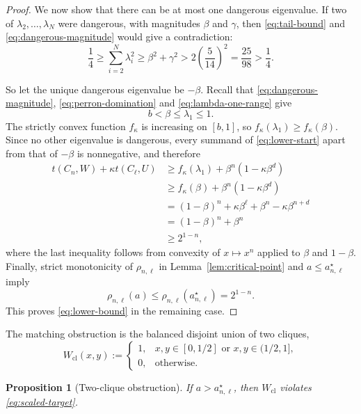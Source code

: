 \documentclass[11pt]{article}
\newtheorem{proposition}[theorem]{Proposition}
\theoremstyle{definition}
\theoremstyle{remark}
\begin{document}
\begin{proof}
  We now show that there can be at most one dangerous eigenvalue.  If two of
  $\lambda_2,\ldots,\lambda_N$ were dangerous, with magnitudes $\beta$ and
  $\gamma$, then \eqref{eq:tail-bound} and \eqref{eq:dangerous-magnitude}
  would give a contradiction:
  \[
    \frac14
    \ge\sum_{i=2}^N\lambda_i^2
    \ge\beta^2+\gamma^2
    >2\left(\frac5{14}\right)^2
    =\frac{25}{98}
    >\frac14.
  \]

  So let the unique dangerous eigenvalue be $-\beta$.  Recall that
  \eqref{eq:dangerous-magnitude}, \eqref{eq:perron-domination} and
  \eqref{eq:lambda-one-range} give
  \[
    b<\beta\le\lambda_1\le1 .
  \]
  The strictly convex function $f_\kappa$ is increasing on $[b,1]$, so
  $f_\kappa(\lambda_1)\ge f_\kappa(\beta)$.  Since no other eigenvalue is
  dangerous, every summand of \eqref{eq:lower-start} apart from that of
  $-\beta$ is nonnegative, and therefore
  \begin{align*}
    t(C_n,W)+\kappa t(C_\ell,U)
    &\ge f_\kappa(\lambda_1)+\beta^n(1-\kappa\beta^d)\\
    &\ge f_\kappa(\beta)+\beta^n(1-\kappa\beta^d)\\
    &=(1-\beta)^n+\kappa\beta^\ell
      +\beta^n-\kappa\beta^{n+d}\\
    &=(1-\beta)^n+\beta^n\\
    &\ge2^{1-n},
  \end{align*}
  where the last inequality follows from convexity of $x\mapsto x^n$ applied
  to $\beta$ and $1-\beta$.  Finally, strict monotonicity of $\rho_{n,\ell}$ in 
  Lemma~\ref{lem:critical-point} and $a\le a_{n,\ell}^{\star}$ imply
  \[
    \rho_{n,\ell}(a)
    \le\rho_{n,\ell}(a_{n,\ell}^{\star})
    =2^{1-n}.
  \]
  This proves \eqref{eq:lower-bound} in the remaining case.
\end{proof}

The matching obstruction is the balanced disjoint union of two cliques,
\[
  W_{\mathrm{cl}}(x,y)
  :=
  \begin{cases}
    1,&x,y\in[0,1/2]
       \text{ or }x,y\in(1/2,1],\\
    0,&\text{otherwise}.
  \end{cases}
\]

\begin{proposition}[Two-clique obstruction]
  \label{prop:obstruction}
  If $a>a_{n,\ell}^{\star}$, then $W_{\mathrm{cl}}$ violates
  \eqref{eq:scaled-target}.
\end{proposition}
\end{document}
